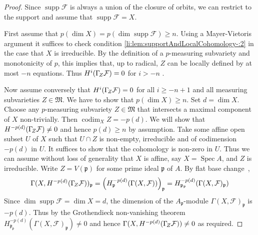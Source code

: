 \documentclass{compositio}
\theoremstyle{plain}
\theoremstyle{definition}
\theoremstyle{remark}
\newcommand\sheaf{\mathcal}
\newcommand\supp{\operatorname{supp}}
\newcommand\codim{\operatorname{codim}}
\DeclareMathOperator\Spec{Spec}
\newcommand\ideal\mathfrak
\newcommand\lc[1]{\Gamma_{\mkern-3mu#1}}
\newcommand\measuringFam{\mathfrak M}
\begin{document}
\begin{proof}
    Since $\supp \sheaf F$ is always a union of the closure of orbits, we can restrict to the support and assume that $\supp \sheaf F = X$.

    First assume that $p(\dim X) = p(\dim \supp \sheaf F) \geq  n$.
    Using a Mayer-Vietoris argument it suffices to check condition \ref{li:lem:supportAndLocalCohomology-:2} in the case that $X$ is irreducible.
    By the definition of a $p$-measuring subvariety and monotonicity of $p$, this implies that, up to radical, $Z$ can be locally defined by at most $-n$ equations.
    Thus $H^i(\lc Z\sheaf F) = 0$ for $i > -n$ \cite[Theorem~3.3.1]{BrodmannSharp:1998:LocalCohomology}. 

    Now assume conversely that $H^i(\lc Z\sheaf F) = 0$ for all $i \geq  -n+1$ and all measuring subvarieties $Z \in  \measuringFam$.
    We have to show that $p(\dim X) \geq  n$.
    Set $d = \dim X$.
    Choose any $p$-measuring subvariety $Z \in  \measuringFam$ that intersects a maximal component of $X$ non-trivially.
    Then $\codim_X Z = -p(d)$.
    We will show that $H^{-p(d)}(\lc Z \sheaf F) \ne 0$ and hence $p(d) \ge n$ by assumption.
    Take some affine open subset $U$ of $X$ such that $U \cap Z$ is non-empty, irreducible and of codimension $-p(d)$ in $U$.
    It suffices to show that the cohomology is non-zero in $U$.
    Thus we can assume without loss of generality that $X$ is affine, say $X = \Spec A$, and $Z$ is irreducible.
    Write $Z = V(\ideal p)$ for some prime ideal $\ideal p$ of $A$.
    By flat base change~\cite[Theorem~4.3.2]{BrodmannSharp:1998:LocalCohomology},
    \[
    \Gamma (X,H^{-p(d)}(\lc Z \sheaf F))_{\ideal p} = 
    \left(H_{\ideal p}^{-p(d)}(\Gamma (X,\sheaf F))\right)_{\ideal p} =
    H_{\ideal p_{\ideal p}}^{-p(d)}(\Gamma (X,\sheaf F)_{\ideal p})
    \]
    Since $\dim \supp \sheaf F = \dim X = d$, the dimension of the $A_{\ideal p}$-module $\Gamma (X,\sheaf F)_{\ideal p}$ is $-p(d)$.
    Thus by the Grothendieck non-vanishing theorem~\cite[Theorem~6.1.4]{BrodmannSharp:1998:LocalCohomology}
    $H_{\ideal p_{\ideal p}}^{-p(d)}(\Gamma (X,\sheaf F)_{\ideal p}) \ne 0$ and hence $\Gamma (X,H^{-p(d)}(\lc Z \sheaf F)) \ne 0$ as required.
\end{proof}
\end{document}
